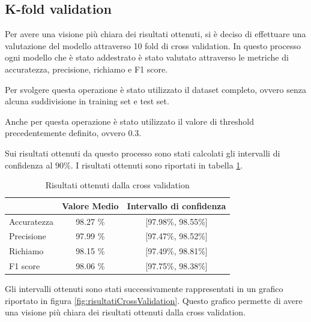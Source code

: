 \subsection*{K-fold validation}
Per avere una visione più chiara dei risultati ottenuti, si è deciso di effettuare
una valutazione del modello attraverso 10 fold di cross validation. In questo
processo ogni modello che è stato addestrato è stato valutato attraverso le
metriche di accuratezza, precisione, richiamo e F1 score.

Per svolgere questa operazione è stato utilizzato il dataset completo, ovvero
senza alcuna suddivisione in training set e test set.

Anche per questa operazione è stato utilizzato il valore di threshold precedentemente
definito, ovvero $0.3$.

Sui risultati ottenuti da questo processo sono stati calcolati gli intervalli
di confidenza al $90\%$. I risultati ottenuti sono riportati in tabella
\ref{tab:risultatiCrossValidation}.

\begin{table}[ht]
    \centering
    \begin{tabular}{@{}lcc@{}}
        \toprule
        \rowcolor[HTML]{EFEFEF}
        \multicolumn{1}{c}{\cellcolor[HTML]{EFEFEF}\textbf{Metrica}} & \textbf{Valore Medio} & \textbf{Intervallo di confidenza} \\ \midrule
        Accuratezza                                                  & 98.27 \%              & [97.98\%, 98.55\%]                \\
        Precisione                                                   & 97.99 \%              & [97.47\%, 98.52\%]                \\
        Richiamo                                                     & 98.15 \%              & [97.49\%, 98.81\%]                \\
        F1 score                                                     & 98.06 \%              & [97.75\%, 98.38\%]                \\ \bottomrule
    \end{tabular}
    \caption{Risultati ottenuti dalla cross validation}
    \label{tab:risultatiCrossValidation}
\end{table}

Gli intervalli ottenuti sono stati successivamente rappresentati in un grafico
riportato in figura \ref{fig:risultatiCrossValidation}. Questo grafico permette
di avere una visione più chiara dei risultati ottenuti dalla cross validation.

